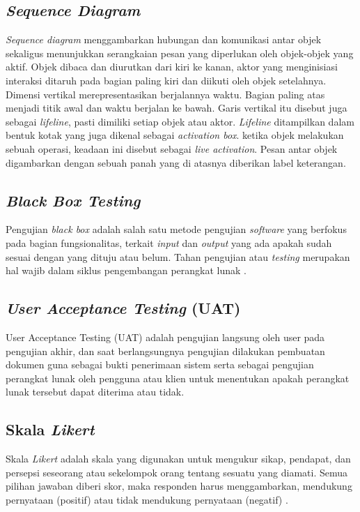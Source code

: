 \begin{flushleft}
\begin{justify}
        \subsection{\emph{Sequence Diagram}}
        \emph{Sequence diagram} menggambarkan hubungan dan komunikasi antar objek \cite{buku scholar} sekaligus 
        menunjukkan serangkaian pesan yang diperlukan oleh objek-objek yang aktif. Objek dibaca dan diurutkan dari kiri ke kanan, 
        aktor yang menginisiasi interaksi ditaruh pada bagian paling kiri dan diikuti oleh objek setelahnya. 
        Dimensi vertikal merepresentasikan berjalannya waktu. Bagian paling atas menjadi titik awal dan 
        waktu berjalan ke bawah. Garis vertikal itu disebut juga sebagai \emph{lifeline}, pasti dimiliki setiap objek atau aktor. 
        \emph{Lifeline} ditampilkan dalam bentuk kotak yang juga dikenal sebagai \emph{activation box}. 
        ketika objek melakukan sebuah operasi, keadaan ini disebut sebagai \emph{live activation}. 
        Pesan antar objek digambarkan dengan sebuah panah yang di atasnya diberikan label keterangan.\\

        \subsection{\textit{Black Box Testing}}
        Pengujian \emph{black box} adalah salah satu metode pengujian \emph{software} yang berfokus pada bagian fungsionalitas, terkait \emph{input} dan \emph{output} yang ada apakah sudah sesuai dengan yang dituju atau belum. Tahan pengujian atau \emph{testing} merupakan hal wajib dalam siklus pengembangan perangkat lunak \cite{black box}.\\
       
       
        \subsection{\textit{User Acceptance Testing} (UAT)}
        User Acceptance Testing (UAT) adalah pengujian langsung oleh user pada pengujian akhir, dan saat berlangsungnya pengujian dilakukan pembuatan dokumen guna sebagai bukti penerimaan sistem \cite{uat} serta sebagai pengujian perangkat lunak oleh pengguna atau klien untuk menentukan apakah perangkat lunak tersebut dapat diterima atau tidak.
        \\

        \subsection{Skala \textit{Likert}}
        Skala \emph{Likert} adalah skala yang digunakan untuk mengukur sikap, pendapat, dan persepsi seseorang atau 
        sekelompok orang tentang sesuatu yang diamati. Semua pilihan jawaban diberi skor, maka responden harus 
        menggambarkan, mendukung pernyataan (positif) atau tidak mendukung pernyataan (negatif) \cite{likert}.






\end{justify}
\end{flushleft}
